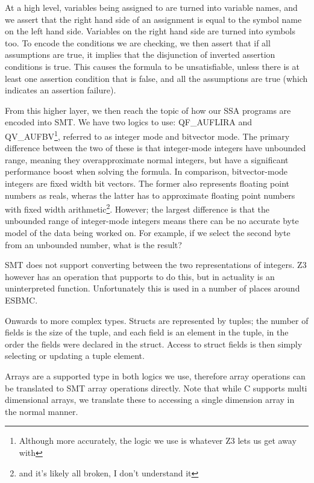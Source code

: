 \documentclass{article}
\begin{document}
At a high level, variables being assigned to are turned into variable names,
and we assert that the right hand side of an assignment is equal to the symbol
name on the left hand side. Variables on the right hand side are turned into
symbols too. To encode the conditions we are checking, we then assert that if
all assumptions are true, it implies that the disjunction of inverted assertion
conditions is true. This causes the formula to be unsatisfiable, unless there
is at least one assertion condition that is false, and all the assumptions are
true (which indicates an assertion failure).

From this higher layer, we then reach the topic of how our SSA programs are
encoded into SMT. We have two logics to use: QF\_AUFLIRA and
QV\_AUFBV\footnote{Although more accurately, the logic we use is whatever Z3
lets us get away with}, referred to as integer mode and bitvector mode.
The primary difference between the two of these is that
integer-mode integers have unbounded range, meaning they overapproximate normal
integers, but have a significant performance boost when solving the formula.
In comparison, bitvector-mode integers are fixed width bit vectors.
The former also represents floating point numbers as reals, wheras the latter
has to approximate floating point numbers with fixed width
arithmetic\footnote{and it's likely all broken, I don't understand it}. However;
the largest difference is that the unbounded range of integer-mode integers
means there can be no accurate byte model of the data being worked on. For
example, if we select the second byte from an unbounded number, what is the
result?

SMT does not support converting between the two representations of integers.
Z3 however has an operation that pupports to do this, but in actuality is an
uninterpreted function. Unfortunately this is used in a number of places
around ESBMC.

Onwards to more complex types. Structs are represented by tuples; the number
of fields is the size of the tuple, and each field is an element in the tuple,
in the order the fields were declared in the struct. Access to struct fields
is then simply selecting or updating a tuple element.

Arrays are a supported type in both logics we use, therefore array operations
can be translated to SMT array operations directly. Note that while C supports
multi dimensional arrays, we translate these to accessing a single dimension
array in the normal manner.
\end{document}
